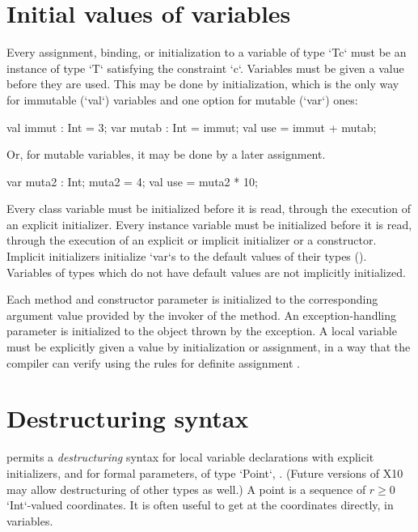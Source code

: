 \section{Initial values of variables}
\label{NullaryConstructor}


Every assignment, binding, or initialization to a variable of type \xcd`T{c}`
must be an instance of type \xcd`T` satisfying the constraint \xcd`{c}`.
Variables must be given a value before they are used. This may be done by
initialization, which is the only way for immutable (\xcd`val`) variables and
one option for mutable (\xcd`var`) ones: 

\begin{xten}
  val immut : Int = 3;
  var mutab : Int = immut;
  val use = immut + mutab;
\end{xten}
Or, for mutable variables, it may be done by a later assignment.  

\begin{xten}
  var muta2 : Int;
  muta2 = 4;
  val use = muta2 * 10;
\end{xten}


Every class variable must be initialized before it is read, through
the execution of an explicit initializer. Every
instance variable must be initialized before it is read, through the
execution of an explicit or implicit initializer or a constructor.
Implicit initializers initialize \xcd`var`s to the default values of their
types (). Variables of types which do not have default
values are not implicitly initialized.



Each method and constructor parameter is initialized to the
corresponding argument value provided by the invoker of the method. An
exception-handling parameter is initialized to the object thrown by
the exception. A local variable must be explicitly given a value by
initialization or assignment, in a way that the compiler can verify
using the rules for definite assignment \cite[\S~16]{jls2}.


\section{Destructuring syntax}
\Xten{} permits a \emph{destructuring} syntax for local variable
declarations with explicit initializers,  and for formal parameters, of type \xcd`Point`, .
(Future versions of X10 may allow destructuring of other types as well.) 
A point is a sequence of {$r \ge 0$} \xcd`Int`-valued coordinates.  
It is often useful to get at the coordinates directly, in variables. 


